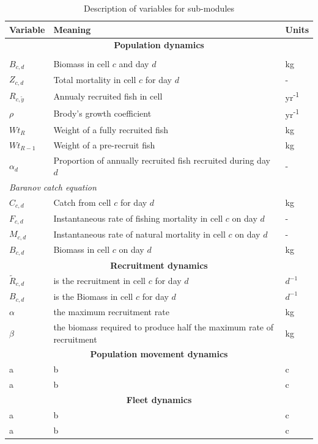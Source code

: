 \documentclass[review]{elsarticle}
\begin{document}
\begin{table}[!ht]
	\centering
	\caption{Description of variables for sub-modules}
	\begin{tabular}{p{1.5cm} p{8cm} p{1.5cm}}
		\toprule
		Variable & Meaning & Units \\
		\hline
		\multicolumn{3}{c}{\textbf{Population dynamics}}  \\
		\hhline{===}
		\multicolumn{3}{l}{\textit{Delay-difference model}} \\
		\hline
		$B_{c,d}$ & Biomass in cell $c$ and day $d$ & kg \\
		$Z_{c,d}$ & Total mortality in cell $c$ for day $d$ & - \\
		$R_{c, \tilde{y}}$  &Annualy recruited fish in cell &  yr\textsuperscript{-1} \\
		$\rho$ & Brody's growth coefficient & yr\textsuperscript{-1} \\
		$Wt_{R}$ & Weight of a fully recruited fish & kg \\
		$Wt_{R-1}$ & Weight of a pre-recruit fish & kg \\
		$\alpha_{d}$ & Proportion of annually recruited fish recruited
		during day $d$ & - \\
		\hline
		\multicolumn{3}{l}{\textit{Baranov catch equation}} \\
		\hline
		$C_{c,d}$ & Catch from cell $c$ for day $d$ & kg \\
		$F_{c,d}$ & Instantaneous rate of fishing mortality in cell $c$
		on day $d$ & - \\
		$M_{c,d}$ & Instantaneous rate of natural mortality in cell $c$
		on day $d$ & - \\
		$B_{c,d}$ & Biomass in cell $c$ on day $d$ & kg \\
		\hline
		\multicolumn{3}{c}{\textbf{Recruitment dynamics}} \\
		\hhline{===}
		$\tilde{R}_{c,d}$ & is the recruitment in cell $c$ for day $d$ & $d^{-1}$ \\
		$B_{c,d}$ & is the Biomass in cell $c$ for day $d$ & $d^{-1}$ \\
		$\alpha$ & the maximum recruitment rate & kg  \\
		$\beta$ & the biomass required to produce half the maximum rate
		of recruitment & kg \\
		\hline
		\multicolumn{3}{c}{\textbf{Population movement dynamics}} \\
		\hhline{===}
		a & b & c \\
		a & b & c \\
		\hline
		\multicolumn{3}{c}{\textbf{Fleet dynamics}} \\
		\hhline{===}
		a & b & c \\
		a & b & c \\
		\bottomrule
	\end{tabular}
\end{table}
\end{document}
